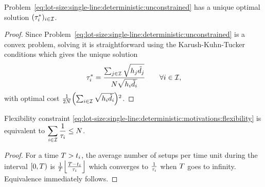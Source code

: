 


\begin{lem}\label{lem:lot-size:single-line:deterministic:unconstrained:optimality}
Problem~\eqref{eq:lot-size:single-line:deterministic:unconstrained} has a unique optimal solution $(\tau_i^*)_{i\in\mathcal{I}}$.
\end{lem}


\begin{proof}
Since Problem~\eqref{eq:lot-size:single-line:deterministic:unconstrained} is a convex problem, solving it is straightforward using the Karush-Kuhn-Tucker conditions which gives the unique solution
\begin{equation}
  \tau_i^*= \frac{\sum_{j\in\mathcal{I}}\sqrt{h_j\tilde{d}_j}}{N\sqrt{h_i\tilde{d}_i}}\qquad\forall i\in\mathcal{I},
\end{equation}
with optimal cost $\frac{1}{2\nbsetups}\bracket{\sum_{i\in\REF}\sqrt{\holding_i\tilde{\demand_i}}}^2$.
\end{proof}



\begin{lem}\label{lem:lot-size:single-line:models:average-setup}
Flexibility constraint \eqref{eq:lot-size:single-line:deterministic:motivations:flexibility} is equivalent to
$\displaystyle\sum_{i\in\mathcal{I}} \frac{1}{\tau_i} \le N$.
\end{lem}


\begin{proof}
For a time $T>t_i$, the average number of setups per time unit during the interval $[0,T)$ is
$\frac{1}{\horizon}\left\lfloor\frac{\horizon-t_i}{\cover_i}\right\rfloor$
which converges to $\frac{1}{\tau_i}$ when $T$ goes to infinity.
Equivalence immediately follows.
\end{proof}


